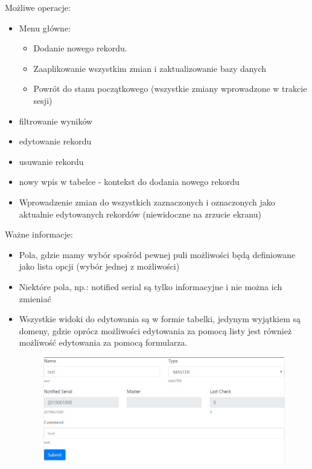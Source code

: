 \documentclass[12pt] {article}
\begin{document}
Możliwe operacje:
\begin{itemize}
\item \color{brown} Menu główne: 
\begin{itemize}
\item Dodanie nowego rekordu.
\item Zaaplikowanie wszystkim zmian i zaktualizowanie bazy danych
\item Powrót do stanu początkowego (wszystkie zmiany wprowadzone w trakcie sesji)
\end{itemize} \color{black}
\item \color{black} filtrowanie wyników \color{black}
\item \color{ao} edytowanie rekordu \color{black}
\item \color{red} usuwanie rekordu \color{black}
\item \color{forestgreen(web)} nowy wpis w tabelce - kontekst do dodania nowego rekordu \color{black}
\item Wprowadzenie zmian do wszystkich zaznaczonych i oznaczonych jako aktualnie edytowanych rekordów (niewidoczne na zrzucie ekranu)
\end{itemize}

Ważne informacje:
\begin{itemize}
\item Pola, gdzie mamy wybór spośród pewnej puli możliwości będą definiowane jako lista opcji (wybór jednej z możliwości)
\item Niektóre pola, np.: notified serial są tylko informacyjne i nie można ich zmieniać
\item Wszystkie widoki do edytowania są w formie tabelki, jedynym wyjątkiem są domeny, gdzie oprócz możliwości edytowania za pomocą listy jest również możliwość edytowania za pomocą formularza. 
\begin{figure}[H]
\centering
\includegraphics[width=\textwidth]{res/formularz}
\end{figure}
\end{itemize}
\end{document}
